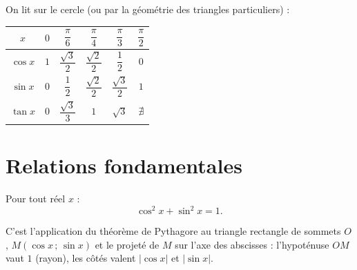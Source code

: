 \begin{propriete}
On lit sur le cercle (ou par la géométrie des triangles particuliers) :
\begin{center}\renewcommand{\arraystretch}{1.6}
\begin{tabular}{@{}c|ccccc@{}}
\toprule
$x$ & $0$ & $\dfrac{\pi}{6}$ & $\dfrac{\pi}{4}$ & $\dfrac{\pi}{3}$ & $\dfrac{\pi}{2}$ \\
\midrule
$\cos x$ & $1$ & $\dfrac{\sqrt3}{2}$ & $\dfrac{\sqrt2}{2}$ & $\dfrac{1}{2}$ & $0$ \\
$\sin x$ & $0$ & $\dfrac{1}{2}$ & $\dfrac{\sqrt2}{2}$ & $\dfrac{\sqrt3}{2}$ & $1$ \\
$\tan x$ & $0$ & $\dfrac{\sqrt3}{3}$ & $1$ & $\sqrt3$ & $\nexists$ \\
\bottomrule
\end{tabular}
\end{center}
\end{propriete}

\begin{illus}
\end{illus}

\section{Relations fondamentales}

\begin{theoreme}
Pour tout réel $x$ :
\[ \cos^2 x + \sin^2 x = 1. \]
\end{theoreme}

\begin{remarque}
C'est l'application du théorème de Pythagore au triangle rectangle de sommets $O$,
$M(\cos x\,;\,\sin x)$ et le projeté de $M$ sur l'axe des abscisses : l'hypoténuse
$OM$ vaut $1$ (rayon), les côtés valent $|\cos x|$ et $|\sin x|$.
\end{remarque}

